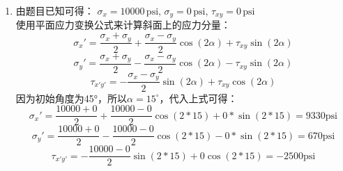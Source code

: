 \begin{enumerate}[]
    \item
    由题目已知可得：
    \( \sigma_x = 10000 \, \text{psi} \), 
    \( \sigma_y = 0 \, \text{psi} \), 
    \( \tau_{xy} = 0 \, \text{psi} \)\\
    使用平面应力变换公式来计算斜面上的应力分量：
    \[\sigma_x' = \frac{\sigma_x + \sigma_y}{2} + \frac{\sigma_x - \sigma_y}{2} \cos(2\alpha) + \tau_{xy} \sin(2\alpha)\]
    \[\sigma_y' = \frac{\sigma_x + \sigma_y}{2} - \frac{\sigma_x - \sigma_y}{2} \cos(2\alpha) - \tau_{xy} \sin(2\alpha)\]
    \[\tau_{x'y'} = - \frac{\sigma_x - \sigma_y}{2} \sin(2\alpha) + \tau_{xy} \cos(2\alpha)\]
    因为初始角度为45°，所以$\alpha=15^{\circ}$，代入上式可得：
    \[\sigma_x' = \frac{10000 + 0}{2} + \frac{10000 - 0}{2} \cos(2*15) + 0 * \sin(2*15) = 9330\text{psi}\]
    \[\sigma_y' = \frac{10000+ 0}{2} - \frac{10000 - 0}{2} \cos(2*15) - 0 * \sin(2*15) = 670\text{psi}\]
    \[\tau_{x'y'} = - \frac{10000 - 0}{2} \sin(2*15) + 0 \cos(2*15) = -2500\text{psi}\]
\end{enumerate}

